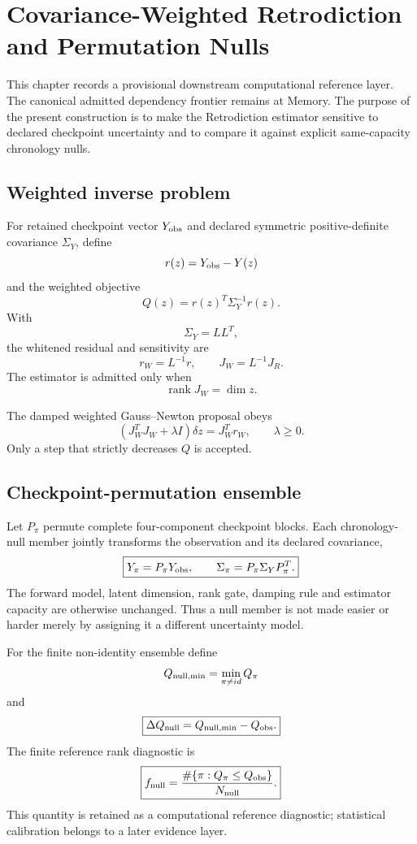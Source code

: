 \chapter{Covariance-Weighted Retrodiction and Permutation Nulls}

This chapter records a provisional downstream computational reference layer. The canonical admitted dependency frontier remains at Memory. The purpose of the present construction is to make the Retrodiction estimator sensitive to declared checkpoint uncertainty and to compare it against explicit same-capacity chronology nulls.

\section{Weighted inverse problem}

For retained checkpoint vector $Y_{\rm obs}$ and declared symmetric positive-definite covariance $\Sigma_Y$, define
\[
r(z)=Y_{\rm obs}-Y(z)
\]
and the weighted objective
\[
\boxed{
Q(z)=r(z)^T\Sigma_Y^{-1}r(z).
}
\]
With
\[
\Sigma_Y=LL^T,
\]
the whitened residual and sensitivity are
\[
r_W=L^{-1}r,
\qquad
J_W=L^{-1}J_R.
\]
The estimator is admitted only when
\[
\boxed{\operatorname{rank}J_W=\dim z.}
\]

The damped weighted Gauss--Newton proposal obeys
\[
\boxed{
(J_W^TJ_W+\lambda I)\delta z=J_W^Tr_W,
\qquad \lambda\ge0.
}
\]
Only a step that strictly decreases $Q$ is accepted.

\section{Checkpoint-permutation ensemble}

Let $P_\pi$ permute complete four-component checkpoint blocks. Each chronology-null member jointly transforms the observation and its declared covariance,
\[
\boxed{
Y_\pi=P_\pi Y_{\rm obs},
\qquad
\Sigma_\pi=P_\pi\Sigma_YP_\pi^T.
}
\]
The forward model, latent dimension, rank gate, damping rule and estimator capacity are otherwise unchanged. Thus a null member is not made easier or harder merely by assigning it a different uncertainty model.

For the finite non-identity ensemble define
\[
Q_{\rm null,min}=\min_{\pi\ne id}Q_\pi
\]
and
\[
\boxed{
\Delta Q_{\rm null}=Q_{\rm null,min}-Q_{\rm obs}.
}
\]
The finite reference rank diagnostic is
\[
\boxed{
f_{\rm null}=\frac{\#\{\pi:Q_\pi\le Q_{\rm obs}\}}{N_{\rm null}}.
}
\]
This quantity is retained as a computational reference diagnostic; statistical calibration belongs to a later evidence layer.

